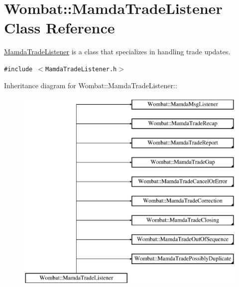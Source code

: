 \hypertarget{classWombat_1_1MamdaTradeListener}{
\section{Wombat::Mamda\-Trade\-Listener Class Reference}
\label{classWombat_1_1MamdaTradeListener}
}
\hyperlink{classWombat_1_1MamdaTradeListener}{Mamda\-Trade\-Listener} is a class that specializes in handling trade updates.  


{\tt \#include $<$Mamda\-Trade\-Listener.h$>$}

Inheritance diagram for Wombat::Mamda\-Trade\-Listener::\begin{figure}[H]
\begin{center}
\leavevmode
\includegraphics[height=10cm]{classWombat_1_1MamdaTradeListener}
\end{center}
\end{figure}
